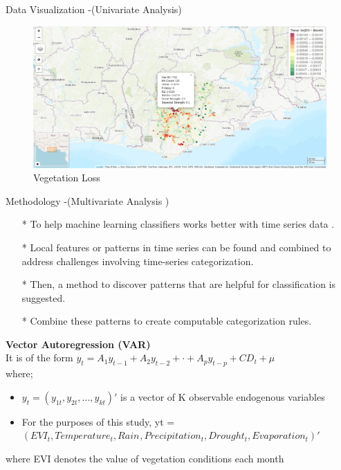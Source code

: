 \documentclass[11pt]{beamer}
\begin{document}
\begin{frame}{Data Visualization -(Univariate Analysis)}
	\begin{figure}
		\centering
		\includegraphics[width=1\textwidth,height=0.8\textheight]{images/Map}
		\caption{Vegetation Loss}
		\label{fig:map}
	\end{figure}
	
\end{frame}
\begin{frame}
	\begin{block}{Methodology -(Multivariate Analysis )}
		\begin{itemize}
		\item[*] To help machine learning classifiers works better with time series data .
		\item[*] Local features or patterns in time series can be found and combined to address challenges involving time-series categorization.
		\item[*] Then, a method to discover patterns that are helpful for classification is suggested.
		\item[*] Combine these patterns to create computable categorization rules. 
	\end{itemize}
\textbf{Vector Autoregression (VAR) }\\

It is of the form 
$y_{t} = A_{1}y_{t-1} + A_{2}y_{t-2} +\cdot+A_{p}y_{t-p}+ CD_{t} + \mu $\\
where;\\
\begin{itemize}
	\item  $ y_{t} = \left( y_{1t},y_{2t},...,y_{kt}\right)'$ is a vector of K observable endogenous variables \\
\item    For the purposes of this study, yt = $(EVI_{t}, Temperature_{t}, Rain_{}, Precipitation_{t},Drought_{t},Evaporation_{t})'$
\end{itemize}
 where EVI denotes the value of vegetation conditions  each month
	\end{block}
\end{frame}
\end{document}

